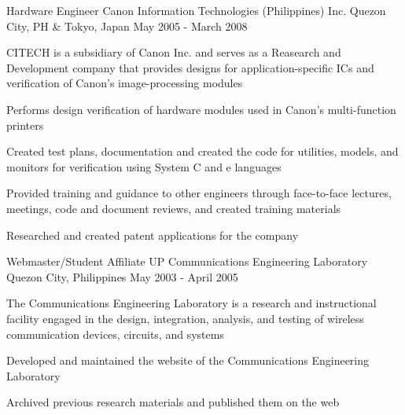 \begin{cventries}
  \cventry
    {Hardware Engineer} %
    {Canon Information Technologies (Philippines) Inc.} %
    {Quezon City, PH \& Tokyo, Japan} %
    {May 2005 - March 2008} %
    {
      \begin{cvitems} %
        \item {CITECH is a subsidiary of Canon Inc. and serves as a Reasearch and Development company that provides designs for application-specific ICs and verification of Canon's image-processing modules}
        \item {Performs design verification of hardware modules used in Canon's multi-function printers}
        \item {Created test plans, documentation and created the code for utilities, models, and monitors for verification using System C and e languages}
        \item {Provided training and guidance to other engineers through face-to-face lectures, meetings, code and document reviews, and created training materials}
        \item {Researched and created patent applications for the company}
      \end{cvitems}
    }

  \cventry
    {Webmaster/Student Affiliate} %
    {UP Communications Engineering Laboratory} %
    {Quezon City, Philippines} %
    {May 2003 - April 2005} %
    {
      \begin{cvitems} %
        \item {The Communications Engineering Laboratory is a research and instructional facility engaged in the design, integration, analysis, and testing of wireless communication devices, circuits, and systems}
        \item {Developed and maintained the website of the Communications Engineering Laboratory}
        \item {Archived previous research materials and published them on the web}
      \end{cvitems}
    }

\end{cventries}

